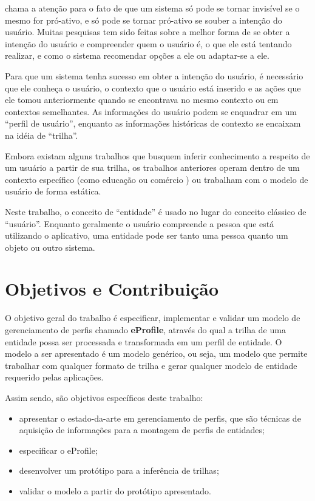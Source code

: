  chama a atenção para o fato de que um sistema só pode se tornar invisível se o mesmo for pró-ativo, e só pode se tornar pró-ativo se souber a intenção do usuário. Muitas pesquisas tem sido feitas sobre a melhor forma de se obter a intenção do usuário e compreender quem o usuário é, o que ele está tentando realizar, e como o sistema recomendar opções a ele ou adaptar-se a ele.

Para que um sistema tenha sucesso em obter a intenção do usuário, é necessário que ele conheça o usuário, o contexto que o usuário está inserido e as ações que ele tomou anteriormente quando se encontrava no mesmo contexto ou em contextos semelhantes. As informações do usuário podem se enquadrar em um ``perfil de usuário'', enquanto as informações históricas de contexto se encaixam na idéia de ``trilha''.

Embora existam alguns trabalhos que busquem inferir conhecimento a respeito de um usuário a partir de sua trilha, os trabalhos anteriores operam dentro de um contexto específico (como educação \cite{barbosa11} ou comércio \cite{franco11}) ou trabalham com o modelo de usuário de forma estática.

Neste trabalho, o conceito de ``entidade'' é usado no lugar do conceito clássico de ``usuário''. Enquanto geralmente o usuário compreende a pessoa que está utilizando o aplicativo, uma entidade pode ser tanto uma pessoa quanto um objeto ou outro sistema.


\section{Objetivos e Contribuição}
\label{sec:objetivos}

O objetivo geral do trabalho é especificar, implementar e validar um modelo de gerenciamento de perfis chamado {\bf eProfile}, através do qual a trilha de uma entidade possa ser processada e transformada em um perfil de entidade. O modelo a ser apresentado é um modelo genérico, ou seja, um modelo que permite trabalhar com qualquer formato de trilha e gerar qualquer modelo de entidade requerido pelas aplicações.

Assim sendo, são objetivos específicos deste trabalho:

\begin{itemize}

  \item apresentar o estado-da-arte em gerenciamento de perfis, que são técnicas de aquisição de informações para a montagem de perfis de entidades;
  \item especificar o eProfile;
  \item desenvolver um protótipo para a inferência de trilhas;
  \item validar o modelo a partir do protótipo apresentado.

\end{itemize}


